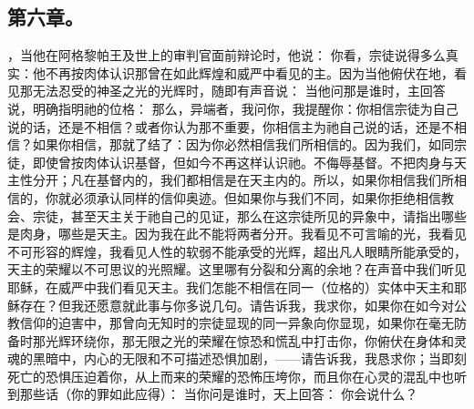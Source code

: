 
\subsection{第六章。}

\par

，当他在阿格黎帕王及世上的审判官面前辩论时，他说： 你看，宗徒说得多么真实：他不再按肉体认识那曾在如此辉煌和威严中看见的主。因为当他俯伏在地，看见那无法忍受的神圣之光的光辉时，随即有声音说： 当他问那是谁时，主回答说，明确指明祂的位格： 那么，异端者，我问你，我提醒你：你相信宗徒为自己说的话，还是不相信？或者你认为那不重要，你相信主为祂自己说的话，还是不相信？如果你相信，那就了结了：因为你必然相信我们所相信的。因为我们，如同宗徒，即使曾按肉体认识基督，但如今不再这样认识祂。不侮辱基督。不把肉身与天主性分开；凡在基督内的，我们都相信是在天主内的。所以，如果你相信我们所相信的，你就必须承认同样的信仰奥迹。但如果你与我们不同，如果你拒绝相信教会、宗徒，甚至天主关于祂自己的见证，那么在这宗徒所见的异象中，请指出哪些是肉身，哪些是天主。因为我在此不能将两者分开。我看见不可言喻的光，我看见不可形容的辉煌，我看见人性的软弱不能承受的光辉，超出凡人眼睛所能承受的，天主的荣耀以不可思议的光照耀。这里哪有分裂和分离的余地？在声音中我们听见耶稣，在威严中我们看见天主。我们怎能不相信在同一（位格的）实体中天主和耶稣存在？但我还愿意就此事与你多说几句。请告诉我，我求你，如果你在如今对公教信仰的迫害中，那曾向无知时的宗徒显现的同一异象向你显现，如果你在毫无防备时那光辉环绕你，那无限之光的荣耀在惊恐和慌乱中打击你，你俯伏在身体和灵魂的黑暗中，内心的无限和不可描述恐惧加剧，——请告诉我，我恳求你；当即刻死亡的恐惧压迫着你，从上而来的荣耀的恐怖压垮你，而且你在心灵的混乱中也听到那些话（你的罪如此应得）： 当你问是谁时，天上回答： 你会说什么？ 